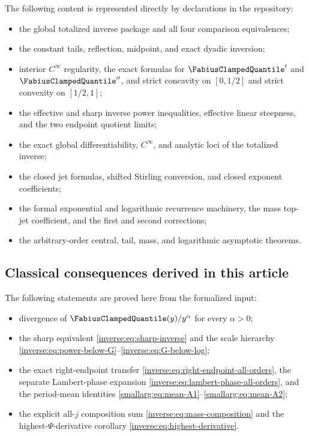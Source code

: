 \documentclass[11pt,oneside]{article}
\theoremstyle{definition}
\theoremstyle{remark}
\begin{document}
The following content is represented directly by declarations in the
repository:
\begin{itemize}
\item the global totalized inverse package and all four comparison
equivalences;
\item the constant tails, reflection, midpoint, and exact dyadic
inversion;
\item interior $C^\infty$ regularity, the exact formulas for $\FabiusClampedQuantile'$ and
$\FabiusClampedQuantile''$, and strict concavity on $[0,1/2]$ and strict convexity on
$[1/2,1]$;
\item the effective and sharp inverse power inequalities, effective
linear steepness, and the two endpoint quotient limits;
\item the exact global differentiability, $C^\infty$, and analytic loci
of the totalized inverse;
\item the closed jet formulas, shifted Stirling conversion, and closed
exponent coefficients;
\item the formal exponential and logarithmic recurrence machinery,
the mass top-jet coefficient, and the first and second corrections;
\item the arbitrary-order central, tail, mass, and logarithmic
asymptotic theorems.
\end{itemize}

\subsection{Classical consequences derived in this article}

The following statements are proved here from the formalized input:
\begin{itemize}
\item divergence of $\FabiusClampedQuantile(y)/y^\alpha$ for every $\alpha>0$;
\item the sharp equivalent \eqref{inverse:eq:sharp-inverse} and the scale
hierarchy \eqref{inverse:eq:power-below-G}--\eqref{inverse:eq:G-below-log};
\item the exact right-endpoint transfer
\eqref{inverse:eq:right-endpoint-all-orders}, the separate Lambert-phase expansion
\eqref{inverse:eq:lambert-phase-all-orders}, and the period-mean identities
\eqref{smallarg:eq:mean-A1}--\eqref{smallarg:eq:mean-A2};
\item the explicit all-$j$ composition sum \eqref{inverse:eq:mass-composition}
and the highest-$\Psi$-derivative corollary
\eqref{inverse:eq:highest-derivative}.
\end{itemize}
\end{document}
